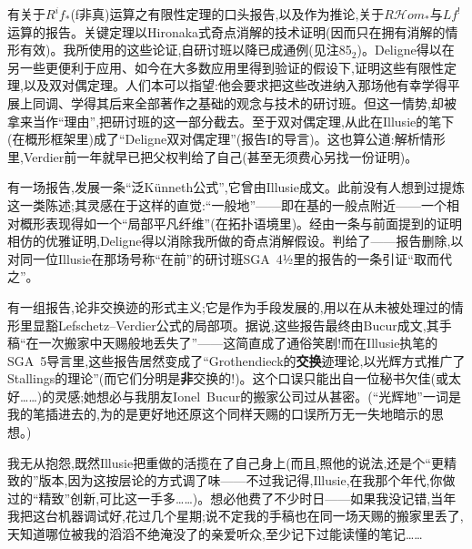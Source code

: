 有关于$R^if_*$(f非真)运算之有限性定理的口头报告,以及作为推论,关于$R\mathcal{H}om_*$与$Lf^!$运算的报告。关键定理以Hironaka式奇点消解的技术证明(因而只在拥有消解的情形有效)。我所使用的这些论证,自研讨班以降已成通例(见注85$_{2}$)。Deligne得以在另一些更便利于应用、如今在大多数应用里得到验证的假设下,证明这些有限性定理,以及双对偶定理。人们本可以指望:他会要求把这些改进纳入那场他有幸学得平展上同调、学得其后来全部著作之基础的观念与技术的研讨班。但这一情势,却被拿来当作“理由”,把研讨班的这一部分截去。至于双对偶定理,从此在Illusie的笔下(在概形框架里)成了“Deligne双对偶定理”(报告I的导言)。这也算公道:解析情形里,Verdier前一年就早已把父权判给了自己(甚至无须费心另找一份证明)。

有一场报告,发展一条“泛Künneth公式”,它曾由Illusie成文。此前没有人想到过提炼这一类陈述;其灵感在于这样的直觉:“一般地”——即在基的一般点附近——一个相对概形表现得如一个“局部平凡纤维”(在拓扑语境里)。经由一条与前面提到的证明相仿的优雅证明,Deligne得以消除我所做的奇点消解假设。判给了——报告删除,以对同一位Illusie在那场号称“在前”的研讨班SGA~4½里的报告的一条引证“取而代之”。

\dmark{}有一组报告,论非交换迹的形式主义;它是作为手段发展的,用以在从未被处理过的情形里显豁Lefschetz--Verdier公式的局部项。据说,这些报告最终由Bucur成文,其手稿“在一次搬家中天赐般地丢失了”——这简直成了通俗笑剧!而在Illusie执笔的SGA~5导言里,这些报告居然变成了“Grothendieck的\textbf{交换}迹理论,以光辉方式推广了Stallings的理论”(而它们分明是\textbf{非}交换的!)。这个口误只能出自一位秘书欠佳(或太好……)的灵感;她想必与我朋友Ionel~Bucur的搬家公司过从甚密。(“光辉地”一词是我的笔插进去的,为的是更好地还原这个同样天赐的口误所万无一失地暗示的思想。)

我无从抱怨,既然Illusie把重做的活揽在了自己身上(而且,照他的说法,还是个“更精致的”版本,因为这按层论的方式调了味——不过我记得,Illusie,在我那个年代,你做过的“精致”创新,可比这一手多……)。想必他费了不少时日——如果我没记错,当年我把这台机器调试好,花过几个星期;说不定我的手稿也在同一场天赐的搬家里丢了,天知道哪位被我的滔滔不绝淹没了的亲爱听众,至少记下过能读懂的笔记……

